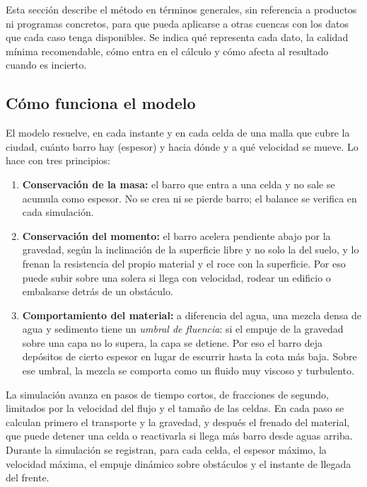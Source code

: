 Esta sección describe el método en términos generales, sin referencia a productos ni programas concretos, para que pueda aplicarse a otras cuencas con los datos que cada caso tenga disponibles. Se indica qué representa cada dato, la calidad mínima recomendable, cómo entra en el cálculo y cómo afecta al resultado cuando es incierto.

\subsection*{Cómo funciona el modelo}
El modelo resuelve, en cada instante y en cada celda de una malla que cubre la ciudad, cuánto barro hay (espesor) y hacia dónde y a qué velocidad se mueve. Lo hace con tres principios:
\begin{enumerate}
\item \textbf{Conservación de la masa:} el barro que entra a una celda y no sale se acumula como espesor. No se crea ni se pierde barro; el balance se verifica en cada simulación.
\item \textbf{Conservación del momento:} el barro acelera pendiente abajo por la gravedad, según la inclinación de la superficie libre y no solo la del suelo, y lo frenan la resistencia del propio material y el roce con la superficie. Por eso puede subir sobre una solera si llega con velocidad, rodear un edificio o embalsarse detrás de un obstáculo.
\item \textbf{Comportamiento del material:} a diferencia del agua, una mezcla densa de agua y sedimento tiene un \emph{umbral de fluencia}: si el empuje de la gravedad sobre una capa no lo supera, la capa se detiene. Por eso el barro deja depósitos de cierto espesor en lugar de escurrir hasta la cota más baja. Sobre ese umbral, la mezcla se comporta como un fluido muy viscoso y turbulento.
\end{enumerate}
La simulación avanza en pasos de tiempo cortos, de fracciones de segundo, limitados por la velocidad del flujo y el tamaño de las celdas. En cada paso se calculan primero el transporte y la gravedad, y después el frenado del material, que puede detener una celda o reactivarla si llega más barro desde aguas arriba. Durante la simulación se registran, para cada celda, el espesor máximo, la velocidad máxima, el empuje dinámico sobre obstáculos y el instante de llegada del frente.

